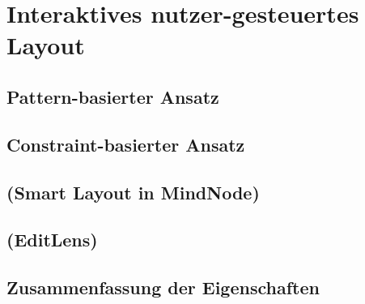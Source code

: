 
\section{Interaktives nutzer-gesteuertes Layout}
\label{sec:interactive-user-controlled-layout}

\subsection{Pattern-basierter Ansatz}

\subsection{Constraint-basierter Ansatz}

\subsection{(Smart Layout in MindNode)}

\subsection{(EditLens)}

\subsection{Zusammenfassung der Eigenschaften}



